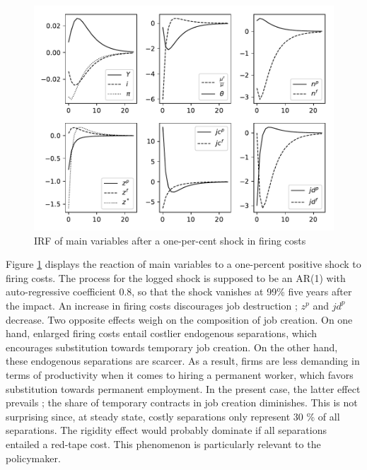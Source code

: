 \documentclass[a4paper]{article}
\begin{document}
\begin{figure}[t]
\includegraphics[scale=1]{IRF_F.pdf}
\caption{IRF of main variables after a one-per-cent shock in firing costs}
\label{IRF_F}
\end{figure}

Figure \ref{IRF_F} displays the reaction of main variables to a one-percent positive shock to firing costs. The process for the logged shock is supposed to be an AR(1) with auto-regressive coefficient 0.8, so that the shock vanishes at 99\% five years after the impact. An increase in firing costs discourages job destruction ; $z^p$ and $jd^p$ decrease. Two opposite effects weigh on the composition of job creation. On one hand, enlarged firing costs entail costlier endogenous separations, which encourages substitution towards temporary job creation. On the other hand, these endogenous separations are scarcer. As a result, firms are less demanding in terms of productivity when it comes to hiring a permanent worker, which favors substitution towards permanent employment. In the present case, the latter effect prevails ;  the share of temporary contracts in job creation diminishes. This is not surprising since, at steady state, costly separations only represent 30 \% of all separations. The rigidity effect would probably dominate if all separations entailed a red-tape cost. This phenomenon is particularly relevant to the policymaker.
\end{document}
